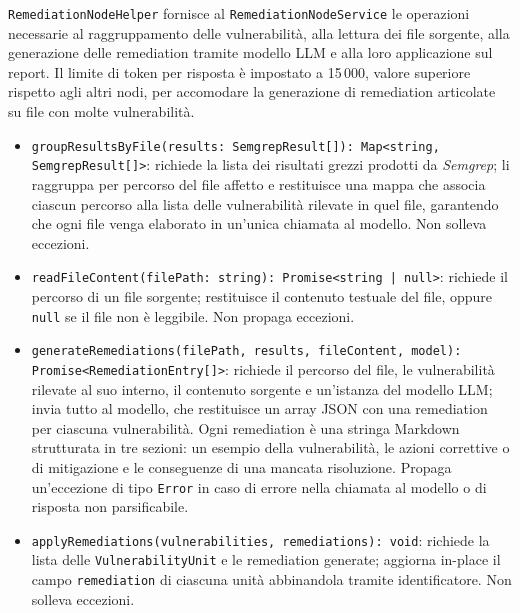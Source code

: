 \documentclass[a4paper, 11pt]{article}
\newcounter{subsubsubsection}[subsubsection]
\begin{document}
\texttt{RemediationNodeHelper} fornisce al \texttt{RemediationNodeService} le operazioni
necessarie al raggruppamento delle vulnerabilità, alla lettura dei file sorgente, alla
generazione delle remediation tramite modello LLM e alla loro applicazione sul report.
Il limite di token per risposta è impostato a 15\,000, valore superiore rispetto agli
altri nodi, per accomodare la generazione di remediation articolate su file con molte
vulnerabilità.
\begin{itemize}
 
  \item \texttt{groupResultsByFile(results: SemgrepResult[]): Map<string, SemgrepResult[]>}:
  richiede la lista dei risultati grezzi prodotti da \textit{Semgrep}; li raggruppa per
  percorso del file affetto e restituisce una mappa che associa ciascun percorso alla
  lista delle vulnerabilità rilevate in quel file, garantendo che ogni file venga
  elaborato in un'unica chiamata al modello. Non solleva eccezioni.
 
  \item \texttt{readFileContent(filePath: string): Promise<string | null>}:
  richiede il percorso di un file sorgente; restituisce il contenuto testuale del file,
  oppure \texttt{null} se il file non è leggibile. Non propaga eccezioni.
 
  \item \texttt{generateRemediations(filePath, results, fileContent, model):}
  \newline \texttt{Promise<RemediationEntry[]>}: \newline
  richiede il percorso del file, le vulnerabilità rilevate al suo interno, il contenuto
  sorgente e un'istanza del modello LLM; invia tutto al modello, che restituisce un array
  JSON con una remediation per ciascuna vulnerabilità. Ogni remediation è una stringa
  Markdown strutturata in tre sezioni: un esempio della vulnerabilità, le azioni
  correttive o di mitigazione e le conseguenze di una mancata risoluzione. Propaga
  un'eccezione di tipo \texttt{Error} in caso di errore nella chiamata al modello o di
  risposta non parsificabile.
 
  \item \texttt{applyRemediations(vulnerabilities, remediations): void}:
  richiede la lista delle \texttt{VulnerabilityUnit} e le remediation generate; aggiorna
  in-place il campo \texttt{remediation} di ciascuna unità abbinandola tramite
  identificatore. Non solleva eccezioni.
\end{itemize}
 
\end{document}
